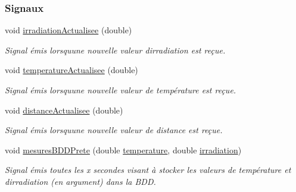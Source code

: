 \subsubsection*{Signaux}
\begin{DoxyCompactItemize}
\item 
void \hyperlink{class_mesures_a8a6e4db8850930d8e4e96c98d5aa95b8}{irradiation\+Actualisee} (double)
\begin{DoxyCompactList}\small\item\em Signal émis lorsqu\textquotesingle{}une nouvelle valeur d\textquotesingle{}irradiation est reçue. \end{DoxyCompactList}\item 
void \hyperlink{class_mesures_ab13d5e64ff21fd869fe347ec1c5a246f}{temperature\+Actualisee} (double)
\begin{DoxyCompactList}\small\item\em Signal émis lorsqu\textquotesingle{}une nouvelle valeur de température est reçue. \end{DoxyCompactList}\item 
void \hyperlink{class_mesures_a6073f147fb08d7c5cc2ce1c9880becbe}{distance\+Actualisee} (double)
\begin{DoxyCompactList}\small\item\em Signal émis lorsqu\textquotesingle{}une nouvelle valeur de distance est reçue. \end{DoxyCompactList}\item 
void \hyperlink{class_mesures_a97d8dbd7742519d1f3ce959661d8aede}{mesures\+B\+D\+D\+Prete} (double \hyperlink{class_mesures_a2688d0da4acf9d91ea0befd6ed0bd140}{temperature}, double \hyperlink{class_mesures_a77cde7672dac5e544b7288364ec7c7b5}{irradiation})
\begin{DoxyCompactList}\small\item\em Signal émis toutes les x secondes visant à stocker les valeurs de température et d\textquotesingle{}irradiation (en argument) dans la B\+DD. \end{DoxyCompactList}\end{DoxyCompactItemize}
